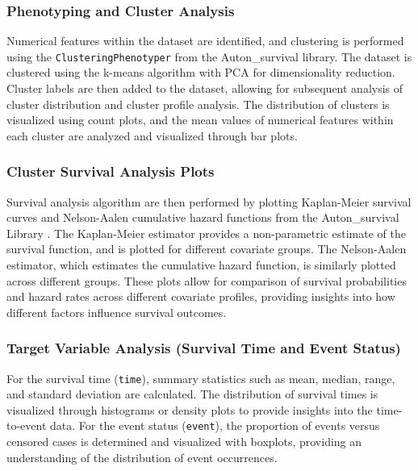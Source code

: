 \subsubsection*{Phenotyping and Cluster Analysis}

Numerical features within the dataset are identified, and clustering is performed using the \texttt{ClusteringPhenotyper} from the Auton\_survival \parencite{nagpal_auton-survival_2022} library. The dataset is clustered using the k-means algorithm with PCA for dimensionality reduction. Cluster labels are then added to the dataset, allowing for subsequent analysis of cluster distribution and cluster profile analysis. The distribution of clusters is visualized using count plots, and the mean values of numerical features within each cluster are analyzed and visualized through bar plots.

\subsubsection*{Cluster Survival Analysis Plots}

Survival analysis algorithm are then performed by plotting Kaplan-Meier survival curves and Nelson-Aalen cumulative hazard functions from the Auton\_survival Library \parencite{nagpal_auton-survival_2022}. The Kaplan-Meier estimator provides a non-parametric estimate of the survival function, and is plotted for different covariate groups. The Nelson-Aalen estimator, which estimates the cumulative hazard function, is similarly plotted across different groups. These plots allow for comparison of survival probabilities and hazard rates across different covariate profiles, providing insights into how different factors influence survival outcomes.


\subsubsection*{Target Variable Analysis (Survival Time and Event Status)}

For the survival time (\texttt{time}), summary statistics such as mean, median, range, and standard deviation are calculated. The distribution of survival times is visualized through histograms or density plots to provide insights into the time-to-event data. For the event status (\texttt{event}), the proportion of events versus censored cases is determined and visualized with boxplots, providing an understanding of the distribution of event occurrences.

